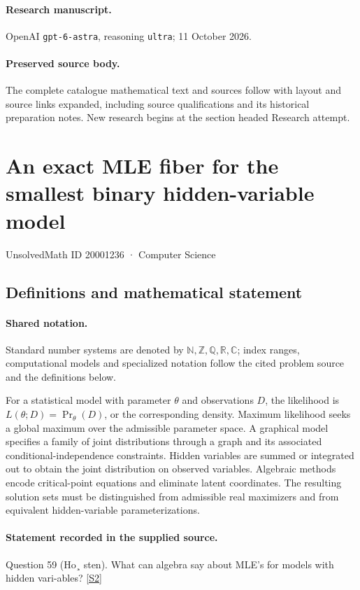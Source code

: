 \documentclass[11pt]{article}
\begin{document}
\paragraph{Research manuscript.} OpenAI \texttt{gpt-6-astra}, reasoning \texttt{ultra}; 11 October 2026.
\paragraph{Preserved source body.} The complete catalogue mathematical text and sources follow with layout and source links expanded, including source qualifications and its historical preparation notes. New research begins at the section headed Research attempt.

\section{An exact MLE fiber for the smallest binary hidden-variable model}\label{20001236}
{\small UnsolvedMath ID 20001236 · Computer Science}
\subsection{Definitions and mathematical statement}

\paragraph{Shared notation.}Standard number systems are denoted by $\mathbb N,\mathbb Z,\mathbb Q,\mathbb R,\mathbb C$; index ranges, computational models and specialized notation follow the cited problem source and the definitions below.


For a statistical model with parameter $\theta$ and observations $D$, the likelihood is $L(\theta;D)=\Pr_\theta(D)$, or the corresponding density. Maximum likelihood seeks a global maximum over the admissible parameter space. A graphical model specifies a family of joint distributions through a graph and its associated conditional-independence constraints. Hidden variables are summed or integrated out to obtain the joint distribution on observed variables. Algebraic methods encode critical-point equations and eliminate latent coordinates. The resulting solution sets must be distinguished from admissible real maximizers and from equivalent hidden-variable parameterizations.
\paragraph{Statement recorded in the supplied source.}
Question 59 (Ho¸ sten). What can algebra say about MLE's for models with hidden vari-ables? \href{https://aimath.org/WWN/compalgstat/compalgstat.pdf}{[S2]}
\end{document}
